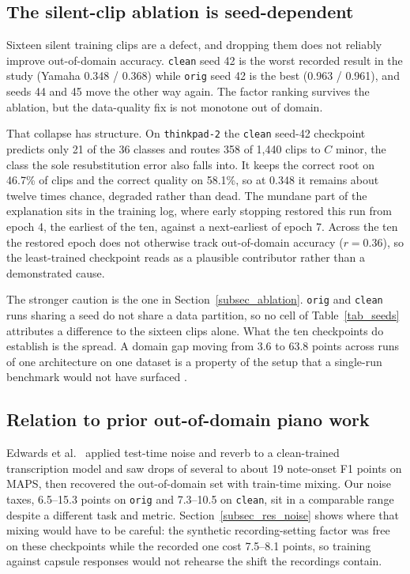 \documentclass[pdflatex,sn-mathphys-num,iicol]{sn-jnl}
\begin{document}
\subsection{The silent-clip ablation is seed-dependent}\label{subsec_disc_ablation}

Sixteen silent training clips are a defect, and dropping them does not reliably improve out-of-domain accuracy. \texttt{clean} seed 42 is the worst recorded result in the study (Yamaha 0.348 / 0.368) while \texttt{orig} seed 42 is the best (0.963 / 0.961), and seeds 44 and 45 move the other way again. The factor ranking survives the ablation, but the data-quality fix is not monotone out of domain.

That collapse has structure. On \texttt{thinkpad-2} the \texttt{clean} seed-42 checkpoint predicts only 21 of the 36 classes and routes 358 of 1{,}440 clips to $C$ minor, the class the sole resubstitution error also falls into. It keeps the correct root on 46.7\% of clips and the correct quality on 58.1\%, so at 0.348 it remains about twelve times chance, degraded rather than dead. The mundane part of the explanation sits in the training log, where early stopping restored this run from epoch 4, the earliest of the ten, against a next-earliest of epoch 7. Across the ten the restored epoch does not otherwise track out-of-domain accuracy ($r=0.36$), so the least-trained checkpoint reads as a plausible contributor rather than a demonstrated cause.

The stronger caution is the one in Section~\ref{subsec_ablation}. \texttt{orig} and \texttt{clean} runs sharing a seed do not share a data partition, so no cell of Table~\ref{tab_seeds} attributes a difference to the sixteen clips alone. What the ten checkpoints do establish is the spread. A domain gap moving from 3.6 to 63.8 points across runs of one architecture on one dataset is a property of the setup that a single-run benchmark would not have surfaced \cite{Bouthillier2021}.

\subsection{Relation to prior out-of-domain piano work}\label{subsec_disc_edwards}

Edwards et al.\ \cite{Edwards2024} applied test-time noise and reverb to a clean-trained transcription model and saw drops of several to about 19 note-onset F1 points on MAPS, then recovered the out-of-domain set with train-time mixing. Our noise taxes, 6.5--15.3 points on \texttt{orig} and 7.3--10.5 on \texttt{clean}, sit in a comparable range despite a different task and metric. Section~\ref{subsec_res_noise} shows where that mixing would have to be careful: the synthetic recording-setting factor was free on these checkpoints while the recorded one cost 7.5--8.1 points, so training against capsule responses would not rehearse the shift the recordings contain.
\end{document}
